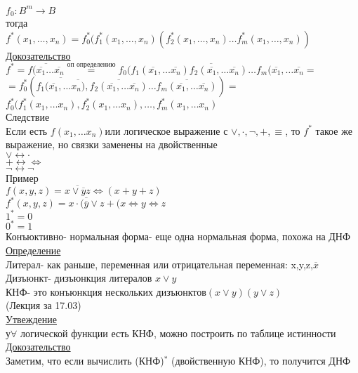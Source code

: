 \documentclass{article}
\begin{document}
$f_0:B^m\rightarrow B$\\
тогда\\
$f^*(x_1,\dots,x_n)=f_0^*(f^*_1(x_1,\dots,x_n)(f^*_2(x_1,\dots,x_n)\dots f_m^*(x_1,\dots,x_n))$\\
\underline{Докозательство}\\
$f^*=\overline{f(\overline{x_1}\dots \overline{x_n}}\overset{\textrm{оп определению}}{=}\overline{f_0(f_1(\overline{x_1},\dots \overline{x_n})f_2(\overline{x_1},\dots \overline{x_n})\dots f_m(\overline{x_1},\dots \overline{x_n}}=$\\
$=f^*_0(\overline{f_1(\overline{x_1},\dots \overline{x_n)}},\overline{f_2(\overline{x_1},\dots \overline{x_n})}\dots \overline{f_m(\overline{x_1},\dots \overline{x_n})})=$\\
$f_0^*(f_1^*(x_1,\dots x_n),f_2^*(x_1,\dots x_n),\dots,f_m^*(x_1,\dots x_n)$\\
Следствие\\
Если есть $f(x_1,\dots x_n)$или логическое выражение с $\vee,\cdot,\neg,+,\equiv$, то $f^*$ такое же выражение, но связки заменены на двойственные\\
$\vee \leftrightarrow \cdot$\\
$+\leftrightarrow \Leftrightarrow$\\
$\neg \leftrightarrow \neg$\\
Пример\\
$f(x,y,z)=\overline{x\vee \overline{y}z}\Leftrightarrow(x+y+z)$\\
$f^*(x,y,z)=\overline{x\cdot(\overline{y}\vee z}+(x\Leftrightarrow y\Leftrightarrow z$\\
$1^*=0$\\
$0^*=1$\\
Конъюктивно- нормальная форма- еще одна нормальная форма, похожа на ДНФ\\
\underline{Определение}\\
Литерал- как раньше, переменная или отрицательная переменная: x,y,z,$\overline{x}$\\
Дизъюнкт- дизъюнкция литералов $x\vee y$\\
КНФ- это конъюнкция нескольких дизъюнктов$(x\vee y)(y\vee z)$\\
(Лекция за 17.03)\\
\underline{Утвеждение}\\
у$\forall$ логической функции есть КНФ, можно построить по таблице истинности\\
\underline{Докозательство}\\
Заметим, что если вычислить (КНФ)$^*$ (двойственную КНФ), то получится ДНФ\\
\end{document}
